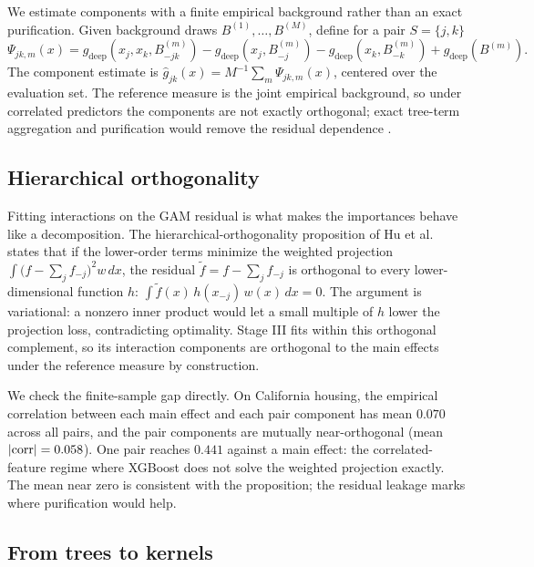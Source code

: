 \documentclass[11pt]{article}
\begin{document}
We estimate components with a finite empirical background rather than an exact
purification. Given background draws $B^{(1)},\ldots,B^{(M)}$, define for a pair
$S=\{j,k\}$
\begin{equation}
 \Psi_{jk,m}(x)=g_{\mathrm{deep}}(x_j,x_k,B^{(m)}_{-jk})
 -g_{\mathrm{deep}}(x_j,B^{(m)}_{-j})
 -g_{\mathrm{deep}}(x_k,B^{(m)}_{-k})
 +g_{\mathrm{deep}}(B^{(m)}).
\label{eq:contrast}
\end{equation}
The component estimate is $\hat g_{jk}(x)=M^{-1}\sum_m\Psi_{jk,m}(x)$, centered
over the evaluation set. The reference measure is the joint empirical background,
so under correlated predictors the components are not exactly orthogonal; exact
tree-term aggregation and purification would remove the residual dependence
\cite{Hooker2007,Lengerich2020,Hu2023}.

\subsection{Hierarchical orthogonality}
\label{sec:ortho}

Fitting interactions on the GAM residual is what makes the importances behave
like a decomposition. The hierarchical-orthogonality proposition of Hu et
al.~\cite{Hu2023} states that if the lower-order terms minimize the weighted
projection $\int\!\big(f-\sum_j f_{-j}\big)^2 w\,dx$, the residual
$\tilde f=f-\sum_j f_{-j}$ is orthogonal to every lower-dimensional function
$h$: $\int \tilde f(x)\,h(x_{-j})\,w(x)\,dx=0$. The argument is variational: a
nonzero inner product would let a small multiple of $h$ lower the projection
loss, contradicting optimality. Stage III fits within this orthogonal
complement, so its interaction components are orthogonal to the main effects
under the reference measure by construction.

We check the finite-sample gap directly. On California housing, the empirical
correlation between each main effect and each pair component has mean $0.070$
across all pairs, and the pair components are mutually near-orthogonal
(mean $|{\rm corr}|=0.058$). One pair reaches $0.441$ against a main effect: the
correlated-feature regime where XGBoost does not solve the weighted projection
exactly. The mean near zero is consistent with the proposition; the residual
leakage marks where purification would help.

\subsection{From trees to kernels}
\label{sec:treekernel}
\end{document}
